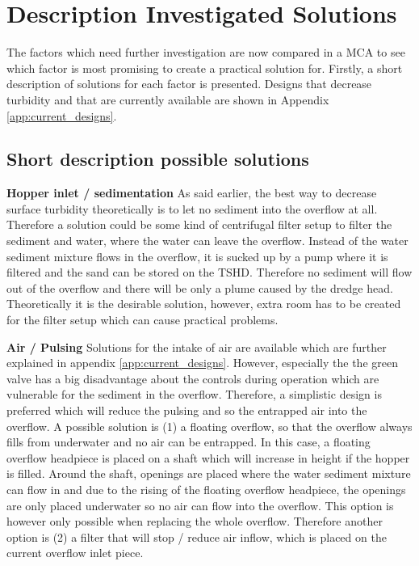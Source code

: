 \chapter{Description Investigated Solutions}

\noindent The factors which need further investigation are now compared in a MCA to see which factor is most promising to create a practical solution for. Firstly, a short description of solutions for each factor is presented. Designs that decrease turbidity and that are currently available are shown in Appendix \ref{app:current_designs}.


\newpage
\section{Short description possible solutions}

\textbf{Hopper inlet / sedimentation} \newline
\noindent As said earlier, the best way to decrease surface turbidity theoretically is to let no sediment into the overflow at all. Therefore a solution could be some kind of centrifugal filter setup to filter the sediment and water, where the water can leave the overflow. Instead of the water sediment mixture flows in the overflow, it is sucked up by a pump where it is filtered and the sand can be stored on the TSHD. Therefore no sediment will flow out of the overflow and there will be only a plume caused by the dredge head. Theoretically it is the desirable solution, however, extra room has to be created for the filter setup which can cause practical problems.  \newline

\noindent \textbf{Air / Pulsing} \newline
\noindent Solutions for the intake of air are available which are further explained in appendix \ref{app:current_designs}. However, especially the the green valve has a big disadvantage about the controls during operation which are vulnerable for the sediment in the overflow. Therefore, a simplistic design is preferred which will reduce the pulsing and so the entrapped air into the overflow. \newline A possible solution is (1) a floating overflow, so that the overflow always fills from underwater and no air can be entrapped. In this case, a floating overflow headpiece is placed on a shaft which will increase in height if the hopper is filled. Around the shaft, openings are placed where the water sediment mixture can flow in and due to the rising of the floating overflow headpiece, the openings are only placed underwater so no air can flow into the overflow. This option is however only possible when replacing the whole overflow. Therefore another option is (2) a filter that will stop / reduce air inflow, which is placed on the current overflow inlet piece. \newline

